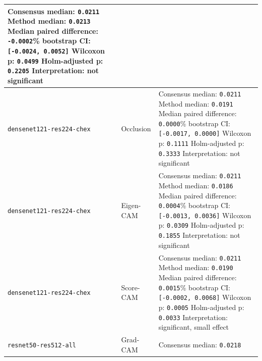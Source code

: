 \begin{longtable}[]{@{}
		>{\raggedright\arraybackslash}p{}
		>{\raggedright\arraybackslash}p{}
		>{\raggedright\arraybackslash}p{}
		@{}}
	Consensus median: \texttt{0.0211}\newline
	Method median: \texttt{0.0213}\newline
	Median paired difference: \texttt{-0.0002}\newline
	95\% bootstrap CI: \texttt{[-0.0024, 0.0052]}\newline
	Wilcoxon p: \texttt{0.0499}\newline
	Holm-adjusted p: \texttt{0.2205}\newline
	Interpretation: not significant\tabularnewline
	\midrule
	\texttt{densenet121-\allowbreak res224-\allowbreak chex} & Occlusion &
	Consensus median: \texttt{0.0211}\newline
	Method median: \texttt{0.0191}\newline
	Median paired difference: \texttt{0.0000}\newline
	95\% bootstrap CI: \texttt{[-0.0017, 0.0000]}\newline
	Wilcoxon p: \texttt{0.1111}\newline
	Holm-adjusted p: \texttt{0.3333}\newline
	Interpretation: not significant\tabularnewline
	\midrule
	\texttt{densenet121-\allowbreak res224-\allowbreak chex} & Eigen-CAM &
	Consensus median: \texttt{0.0211}\newline
	Method median: \texttt{0.0186}\newline
	Median paired difference: \texttt{0.0004}\newline
	95\% bootstrap CI: \texttt{[-0.0013, 0.0036]}\newline
	Wilcoxon p: \texttt{0.0309}\newline
	Holm-adjusted p: \texttt{0.1855}\newline
	Interpretation: not significant\tabularnewline
	\midrule
	\texttt{densenet121-\allowbreak res224-\allowbreak chex} & Score-CAM &
	Consensus median: \texttt{0.0211}\newline
	Method median: \texttt{0.0190}\newline
	Median paired difference: \texttt{0.0015}\newline
	95\% bootstrap CI: \texttt{[-0.0002, 0.0068]}\newline
	Wilcoxon p: \texttt{0.0005}\newline
	Holm-adjusted p: \texttt{0.0033}\newline
	Interpretation: significant, small effect\tabularnewline
	\midrule
	\texttt{resnet50-\allowbreak res512-\allowbreak all} & Grad-CAM &
	Consensus median: \texttt{0.0218}\newline

\end{longtable}

